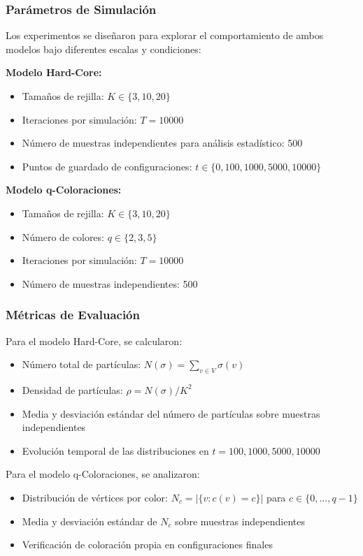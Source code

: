 \subsubsection{Parámetros de Simulación}

Los experimentos se diseñaron para explorar el comportamiento de ambos modelos bajo diferentes escalas y condiciones:

\textbf{Modelo Hard-Core:}
\begin{itemize}
\item Tamaños de rejilla: $K \in \{3, 10, 20\}$
\item Iteraciones por simulación: $T = 10000$
\item Número de muestras independientes para análisis estadístico: 500
\item Puntos de guardado de configuraciones: $t \in \{0, 100, 1000, 5000, 10000\}$
\end{itemize}

\textbf{Modelo q-Coloraciones:}
\begin{itemize}
\item Tamaños de rejilla: $K \in \{3, 10, 20\}$
\item Número de colores: $q \in \{2, 3, 5\}$
\item Iteraciones por simulación: $T = 10000$
\item Número de muestras independientes: 500
\end{itemize}

\subsubsection{Métricas de Evaluación}

Para el modelo Hard-Core, se calcularon:
\begin{itemize}
\item Número total de partículas: $N(\sigma) = \sum_{v \in V} \sigma(v)$
\item Densidad de partículas: $\rho = N(\sigma) / K^2$
\item Media y desviación estándar del número de partículas sobre muestras independientes
\item Evolución temporal de las distribuciones en $t = 100, 1000, 5000, 10000$
\end{itemize}

Para el modelo q-Coloraciones, se analizaron:
\begin{itemize}
\item Distribución de vértices por color: $N_c = |\{v : c(v) = c\}|$ para $c \in \{0, \ldots, q-1\}$
\item Media y desviación estándar de $N_c$ sobre muestras independientes
\item Verificación de coloración propia en configuraciones finales
\end{itemize}

